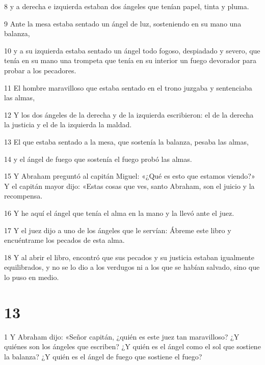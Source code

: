 \par 8 y a derecha e izquierda estaban dos ángeles que tenían papel, tinta y pluma.

\par 9 Ante la mesa estaba sentado un ángel de luz, sosteniendo en su mano una balanza,

\par 10 y a su izquierda estaba sentado un ángel todo fogoso, despiadado y severo, que tenía en su mano una trompeta que tenía en su interior un fuego devorador para probar a los pecadores.

\par 11 El hombre maravilloso que estaba sentado en el trono juzgaba y sentenciaba las almas,

\par 12 Y los dos ángeles de la derecha y de la izquierda escribieron: el de la derecha la justicia y el de la izquierda la maldad.

\par 13 El que estaba sentado a la mesa, que sostenía la balanza, pesaba las almas,

\par 14 y el ángel de fuego que sostenía el fuego probó las almas.

\par 15 Y Abraham preguntó al capitán Miguel: «¿Qué es esto que estamos viendo?» Y el capitán mayor dijo: «Estas cosas que ves, santo Abraham, son el juicio y la recompensa.

\par 16 Y he aquí el ángel que tenía el alma en la mano y la llevó ante el juez.

\par 17 Y el juez dijo a uno de los ángeles que le servían: Ábreme este libro y encuéntrame los pecados de esta alma.

\par 18 Y al abrir el libro, encontró que sus pecados y su justicia estaban igualmente equilibrados, y no se lo dio a los verdugos ni a los que se habían salvado, sino que lo puso en medio.


\chapter{13}

\par 1 Y Abraham dijo: «Señor capitán, ¿quién es este juez tan maravilloso? ¿Y quiénes son los ángeles que escriben? ¿Y quién es el ángel como el sol que sostiene la balanza? ¿Y quién es el ángel de fuego que sostiene el fuego?


